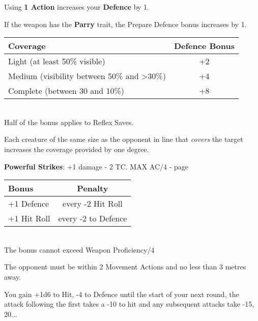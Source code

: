 \documentclass[landscape,10pt,a4paper]{article}
\begin{document}
\begin{multicols}{3}
\begin{dmbox}[title=Prepare Defence - page \pageref{prepareladifesa}]

Using \textbf{1 Action} increases your \textbf{Defence} by 1.

If the weapon has the \textbf{Parry} trait, the Prepare Defence bonus increases by 1.
\end{dmbox}

\begin{dmbox}[title=Cover - page \pageref{copertura}]
\noindent\begin{tabular}{l|c}
\textbf{Coverage} & \textbf{Defence Bonus}\\
\hline
Light (at least 50\% visible) & +2\\
Medium (visibility between 50\% and >30\%) & +4 \\
Complete (between 30 and 10\%) & +8 \\
\end{tabular}\\

Half of the bonus applies to Reflex Saves.

Each creature of the same size as the opponent in line that \emph{covers} the target increases the coverage provided by one degree.

\end{dmbox}

\begin{mybluebox}\textbf{Powerful Strikes}: +1 damage - 2 TC. MAX AC/4 - page \pageref{powerfulstrikes}\end{mybluebox}


\begin{dmbox}[title=Combat Mastery - page \pageref{combatmastery}]
\noindent\begin{tabular}{l|c}
\textbf{Bonus} & \textbf{Penalty}\\
\hline
+1 Defence & every -2 Hit Roll\\
+1 Hit Roll & every -2 to Defence
\end{tabular}\\

The bonus cannot exceed Weapon Proficiency/4
\end{dmbox}

\begin{dmbox}[title=Charge - page \pageref{charge}]

The opponent must be within 2 Movement Actions and no less than 3 metres away. 

You gain +1d6 to Hit, -4 to Defence until the start of your next round, the attack following the first takes a -10 to hit and any subsequent attacks take -15, 20...


\end{dmbox}
\end{multicols}
\end{document}
